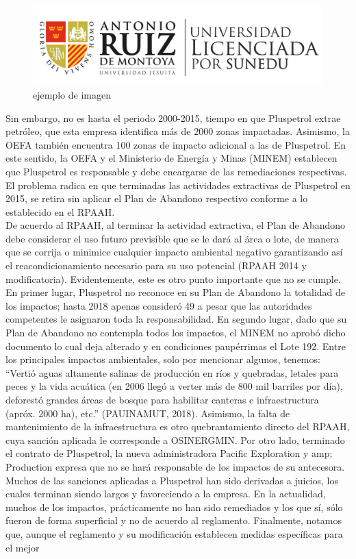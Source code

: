 \documentclass[12pt, a4paper]{article} %
\begin{document}
\begin{multicols}{2}
             \begin{figure}[H]
                \centering
                \includegraphics[scale=0.2]{logo_ruiz.png}
                \caption{ejemplo de imagen}
                \label{fig:figura2}
            \end{figure}
            
            Sin embargo, no es hasta el periodo 2000-2015, tiempo en que Pluspetrol extrae petróleo, que esta empresa identifica más de 2000 zonas impactadas. Asimismo, la OEFA también encuentra 100 zonas de impacto adicional a las de Pluspetrol. En este sentido, la OEFA y el Ministerio de Energía y Minas (MINEM) establecen que Pluspetrol es responsable y debe encargarse de las remediaciones respectivas. El problema radica en que terminadas las actividades extractivas de Pluspetrol en 2015, se retira sin aplicar el Plan de Abandono respectivo conforme a lo establecido en el RPAAH.\\De acuerdo al RPAAH, al terminar la actividad extractiva, el Plan de Abandono debe considerar el uso futuro previsible que se le dará al área o lote, de manera que se corrija o minimice cualquier impacto ambiental negativo garantizando así el reacondicionamiento necesario para su uso potencial (RPAAH 2014 y modificatoria). Evidentemente, este es otro punto importante que no se cumple. En primer lugar, Pluspetrol no reconoce en su Plan de Abandono la totalidad de los impactos; hasta 2018 apenas consideró 49 a pesar que las autoridades competentes le asignaron toda la responsabilidad. En segundo lugar, dado que su Plan de Abandono no contempla todos los impactos, el MINEM no aprobó dicho documento lo cual deja alterado y en condiciones paupérrimas el Lote 192. Entre los principales impactos ambientales, solo por mencionar algunos, tenemos: “Vertió aguas altamente salinas de producción en ríos y quebradas, letales para peces y la vida acuática (en 2006 llegó a verter más de 800 mil barriles por día), deforestó grandes áreas de bosque para habilitar canteras e infraestructura (apróx. 2000 ha), etc.” (PAUINAMUT, 2018). Asimismo, la falta de mantenimiento de la infraestructura es otro quebrantamiento directo del RPAAH, cuya sanción aplicada le corresponde a OSINERGMIN. Por otro lado, terminado el contrato de Pluspetrol, la nueva administradora Pacific Exploration y amp; Production expresa que no se hará responsable de los impactos de su antecesora. \\Muchos de las sanciones aplicadas a Pluspetrol han sido derivadas a juicios, los cuales terminan siendo largos y favoreciendo a la empresa. En la actualidad, muchos de los impactos, prácticamente no han sido remediados y los que sí, sólo fueron de forma superficial y no de acuerdo al reglamento. Finalmente, notamos que, aunque el reglamento y su modificación establecen medidas específicas para el mejor 
\end{multicols}
\end{document}
